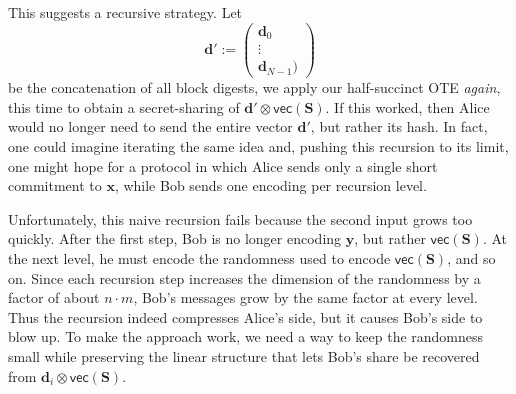 \documentclass{theoretics}
\begin{document}
{This suggests a recursive strategy. Let \[\mathbf{d}' := \begin{pmatrix}\mathbf{d}_0\\\vdots\\\mathbf{d}_{N-1})\end{pmatrix}\]
be the concatenation of all block digests, we apply our half-succinct OTE \emph{again}, this time to obtain a secret-sharing of
$\mathbf{d}' \otimes \mathsf{vec}(\mathbf{S})$.
If this worked, then Alice would no longer need to send the entire vector $\mathbf{d}'$, but rather its hash.
In fact, one could imagine iterating the same idea and, pushing this recursion to its limit, one might hope for a protocol in which Alice sends only a single short commitment to $\mathbf{x}$, while Bob sends one encoding per recursion level.}

{Unfortunately, this naive recursion fails because the second input grows too quickly. After the first step, Bob is no longer encoding $\mathbf{y}$, but rather $\mathsf{vec}(\mathbf{S})$. At the next level, he must encode the randomness used to encode $\mathsf{vec}(\mathbf{S})$, and so on. Since each recursion step increases the dimension of the randomness by a factor of about $n\cdot m$, Bob's messages grow by the same factor at every level. Thus the recursion indeed compresses Alice's side, but it causes Bob's side to blow up. To make the approach work, we need a way to keep the randomness small while preserving the linear structure that lets Bob's share be recovered from $\mathbf{d}_i \otimes \mathsf{vec}(\mathbf{S})$.}
\end{document}
